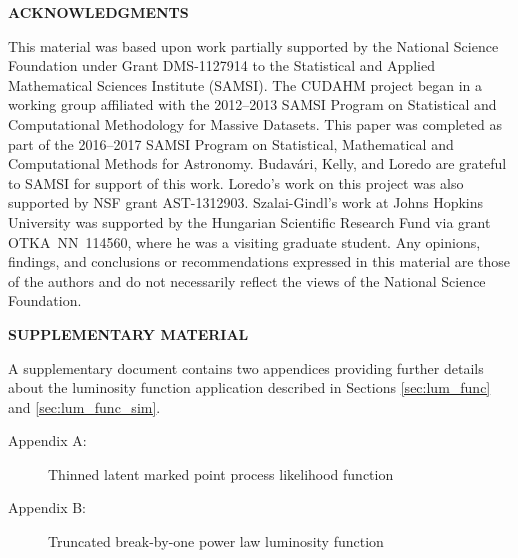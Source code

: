 \documentclass[12pt]{article}
\numberwithin{equation}{section}
\numberwithin{figure}{section}
\numberwithin{table}{section}
\begin{document}

%





\begin{center}
{\large\bf ACKNOWLEDGMENTS}
\end{center}

This material was based upon work partially supported by the National Science Foundation under Grant DMS-1127914 to the Statistical and Applied Mathematical Sciences Institute (SAMSI). 
The CUDAHM project began in a working group affiliated with the 2012--2013 SAMSI Program on Statistical and Computational Methodology for Massive Datasets.
This paper was completed as part of the 2016--2017 SAMSI Program on Statistical, Mathematical and Computational Methods for Astronomy.
Budav\'ari, Kelly, and Loredo are grateful to SAMSI for support of this work.
Loredo's work on this project was also supported by NSF grant AST-1312903.
Szalai-Gindl's work at Johns Hopkins University was supported by the Hungarian Scientific Research Fund via grant OTKA~NN~114560, where he was a visiting graduate student.
Any opinions, findings, and conclusions or recommendations expressed in this material are those of the authors and do not necessarily reflect the views of the National Science Foundation.


\begin{center}
{\large\bf SUPPLEMENTARY MATERIAL}
\end{center}

A supplementary document contains two appendices providing further details about the luminosity function application described in Sections \ref{sec:lum_func} and \ref{sec:lum_func_sim}.
\begin{description}
\item[Appendix A:] Thinned latent marked point process likelihood function
\item[Appendix B:] Truncated break-by-one power law luminosity function
\end{description}





\end{document}
